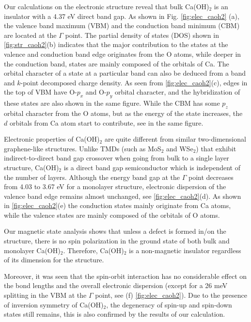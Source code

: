 Our calculations on the electronic structure reveal that bulk Ca(OH)$_2$ is 
an insulator with a 4.37 eV direct band gap. As shown in Fig. 
\ref{fig:elec_caoh2} (a), the valence band maximum (VBM) and the conduction 
band minimum (CBM) are located at the $\Gamma$ point. The partial density of 
states (DOS) shown in \autoref{fig:str_caoh2}(b) indicates that the major 
contribution to the states at the valence and conduction band edge originates 
from the O atoms, while deeper in the conduction band, states are mainly composed 
of the orbitals of Ca. The orbital character of a state at a particular band can 
also be deduced from a band and $k$-point decomposed charge density. As seen 
from \autoref{fig:elec_caoh2}(c), edges in the top of VBM have O-$p_x$ 
and O-$p_y$ orbital character, and the hybridization of these states are also 
shown in the same figure. While the CBM has some $p_z$ orbital 
character from the O atoms, but as the energy of the state increases, the $d$ 
orbitals from Ca atom start to contribute, see  in the same figure.


Electronic properties of Ca(OH)$_2$ are quite different from similar
two-dimensional graphene-like structures. Unlike TMDs (such as MoS$_2$ and
WSe$_2$) that exhibit indirect-to-direct band gap crossover when going
from bulk to a single layer structure, Ca(OH)$_2$ is a direct band gap
semiconductor which is independent of the number of layers. Although the energy band gap
at the $\Gamma$ point decreases from 4.03 to 3.67 eV for a monolayer structure,
electronic dispersion of the valence band edge remains almost unchanged, see
\autoref{fig:elec_caoh2}(d). As shown in \autoref{fig:elec_caoh2}(e)  
the conduction states mainly originate from Ca atoms, while the valence states 
are mainly composed of the orbitals of O atoms. 

Our magnetic state analysis shows that unless a defect is formed in/on the 
structure, there is no spin polarization in the ground state of both bulk and monolayer Ca(OH)$_2$. Therefore, Ca(OH)$_2$ is a non-magnetic insulator regardless of its dimension for the structure. 

Moreover, it was seen that the spin-orbit interaction has no 
considerable effect on the bond lengths and the overall electronic dispersion 
(except for a 26 meV splitting in the VBM at the 
$\Gamma$ point, see (f) \autoref{fig:elec_caoh2}). Due to the presence of inversion symmetry of Ca(OH)$_2$, the 
degeneracy of spin-up and spin-down states still remains, this is also confirmed 
by the results of our calculation.


